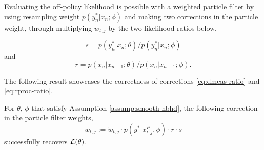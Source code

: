 \documentclass{article}
\begin{document}
Evaluating the off-policy likelihood is possible with a weighted particle filter by using resampling weight $p(y^*_n|x_n;\phi)$ and making two corrections in the particle weight, through multiplying $w_{t,j}$ by the two likelihood ratios below,

\begin{equation}
    \label{eq:dmeas-ratio}
    s=p(y^*_n|x_n;\theta)/p(y^*_n|x_n;\phi)
\end{equation}
and
\begin{equation}
    \label{eq:rproc-ratio}
    r=p(x_n|x_{n-1};\theta)/p(x_n|x_{n-1};\phi).
\end{equation}


The following result showcases the correctness of corrections \ref{eq:dmeas-ratio} and \ref{eq:rproc-ratio}.

\begin{prop}
    For $\theta$, $\phi$ that satisfy Assumption \ref{assump:smooth-nbhd}, the following correction in the particle filter weights,
    \begin{equation}
        w_{t,j} := \tilde{w}_{t,j} \cdot p(y^*|x_{t,j}^P,\phi)\cdot r \cdot s
    \end{equation}
    successfully recovers $\mathcal{L}(\theta)$.
\end{prop}
\end{document}
